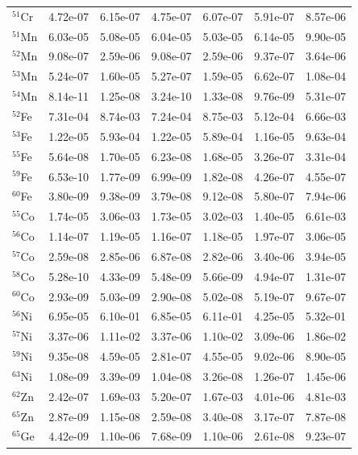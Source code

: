 \begin{table}
\begin{tabular}{l|cc|cc|cc}
$^{51}$Cr & 4.72e-07 & 6.15e-07 & 4.75e-07 & 6.07e-07 & 5.91e-07 & 8.57e-06\\
$^{51}$Mn & 6.03e-05 & 5.08e-05 & 6.04e-05 & 5.03e-05 & 6.14e-05 & 9.90e-05\\
$^{52}$Mn & 9.08e-07 & 2.59e-06 & 9.08e-07 & 2.59e-06 & 9.37e-07 & 3.64e-06\\
$^{53}$Mn & 5.24e-07 & 1.60e-05 & 5.27e-07 & 1.59e-05 & 6.62e-07 & 1.08e-04\\
$^{54}$Mn & 8.14e-11 & 1.25e-08 & 3.24e-10 & 1.33e-08 & 9.76e-09 & 5.31e-07\\
$^{52}$Fe & 7.31e-04 & 8.74e-03 & 7.24e-04 & 8.75e-03 & 5.12e-04 & 6.66e-03\\
$^{53}$Fe & 1.22e-05 & 5.93e-04 & 1.22e-05 & 5.89e-04 & 1.16e-05 & 9.63e-04\\
$^{55}$Fe & 5.64e-08 & 1.70e-05 & 6.23e-08 & 1.68e-05 & 3.26e-07 & 3.31e-04\\
$^{59}$Fe & 6.53e-10 & 1.77e-09 & 6.99e-09 & 1.82e-08 & 4.26e-07 & 4.55e-07\\
$^{60}$Fe & 3.80e-09 & 9.38e-09 & 3.79e-08 & 9.12e-08 & 5.80e-07 & 7.94e-06\\
$^{55}$Co & 1.74e-05 & 3.06e-03 & 1.73e-05 & 3.02e-03 & 1.40e-05 & 6.61e-03\\
$^{56}$Co & 1.14e-07 & 1.19e-05 & 1.16e-07 & 1.18e-05 & 1.97e-07 & 3.06e-05\\
$^{57}$Co & 2.59e-08 & 2.85e-06 & 6.87e-08 & 2.82e-06 & 3.40e-06 & 3.94e-05\\
$^{58}$Co & 5.28e-10 & 4.33e-09 & 5.48e-09 & 5.66e-09 & 4.94e-07 & 1.31e-07\\
$^{60}$Co & 2.93e-09 & 5.03e-09 & 2.90e-08 & 5.02e-08 & 5.19e-07 & 9.67e-07\\
$^{56}$Ni & 6.95e-05 & 6.10e-01 & 6.85e-05 & 6.11e-01 & 4.25e-05 & 5.32e-01\\
$^{57}$Ni & 3.37e-06 & 1.11e-02 & 3.37e-06 & 1.10e-02 & 3.09e-06 & 1.86e-02\\
$^{59}$Ni & 9.35e-08 & 4.59e-05 & 2.81e-07 & 4.55e-05 & 9.02e-06 & 8.90e-05\\
$^{63}$Ni & 1.08e-09 & 3.39e-09 & 1.04e-08 & 3.26e-08 & 1.26e-07 & 1.45e-06\\
$^{62}$Zn & 2.42e-07 & 1.69e-03 & 5.20e-07 & 1.67e-03 & 4.01e-06 & 4.81e-03\\
$^{65}$Zn & 2.87e-09 & 1.15e-08 & 2.59e-08 & 3.40e-08 & 3.17e-07 & 7.87e-08\\
$^{65}$Ge & 4.42e-09 & 1.10e-06 & 7.68e-09 & 1.10e-06 & 2.61e-08 & 9.23e-07\\
\hline
\end{tabular}
\end{table}

